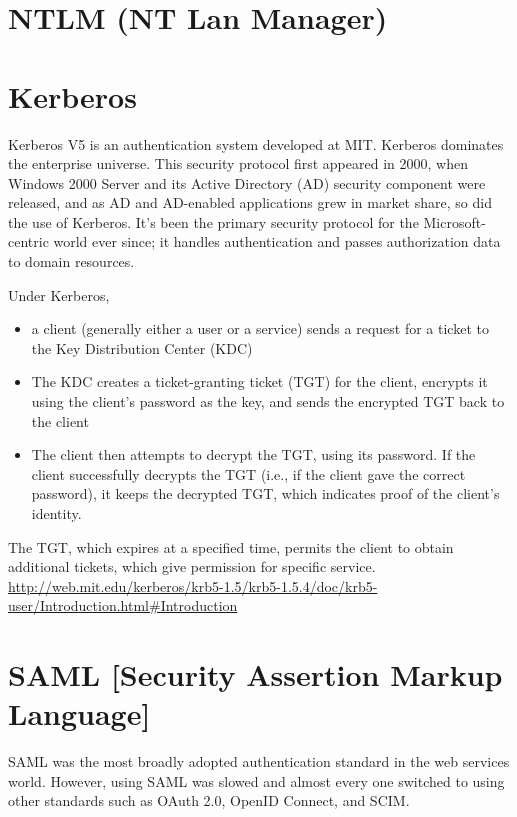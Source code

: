 \section{NTLM (NT Lan Manager)}


\section{Kerberos}
\label{sec:Kerberos}

Kerberos V5 is an authentication system developed at MIT.
Kerberos dominates the enterprise universe. This security protocol first
appeared in 2000, when Windows 2000 Server and its Active Directory (AD)
security component were released, and as AD and AD-enabled applications grew in
market share, so did the use of Kerberos. It's been the primary security
protocol for the Microsoft-centric world ever since; it handles authentication
and passes authorization data to domain resources.


Under Kerberos, 
\begin{itemize}
  \item a client (generally either a user or a service) sends a request
for a ticket to the Key Distribution Center (KDC)

  \item  The KDC creates a ticket-granting ticket (TGT) for the client, encrypts
  it using the client's password as the key, and sends the encrypted TGT back to the client
  
  \item  The client then attempts to decrypt the TGT, using its password. If the
  client successfully decrypts the TGT (i.e., if the client gave the correct
  password), it keeps the decrypted TGT, which indicates proof of the client's
  identity.
  
\end{itemize}
The TGT, which expires at a specified time, permits the client to obtain
additional tickets, which give permission for specific service.
\url{http://web.mit.edu/kerberos/krb5-1.5/krb5-1.5.4/doc/krb5-user/Introduction.html#Introduction}


\section{SAML [Security Assertion Markup Language]}
\label{sec:SAML}

SAML was the most broadly adopted authentication standard in the web services
world. However, using SAML was slowed and almost every one switched to using
other standards such as OAuth 2.0, OpenID Connect, and SCIM.


